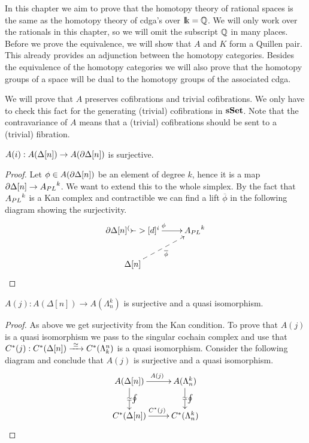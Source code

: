 

In this chapter we aim to prove that the homotopy theory of rational spaces is the same as the homotopy theory of cdga's over $\mathrm{I\!k} = \mathbb{Q}$. We will only work over the rationals in this chapter, so we will omit the subscript $\mathbb{Q}$ in many places. Before we prove the equivalence, we will show that $A$ and $K$ form a Quillen pair. This already provides an adjunction between the homotopy categories. Besides the equivalence of the homotopy categories we will also prove that the homotopy groups of a space will be dual to the homotopy groups of the associated cdga.

We will prove that $A$ preserves cofibrations and trivial cofibrations. We only have to check this fact for the generating (trivial) cofibrations in $\mathbf{s{\mathbf{Set}}}$. Note that the contravariance of $A$ means that a (trivial) cofibrations should be sent to a (trivial) fibration.

\begin{lemma}
	$A(i) : A(\Delta[n]) \to A(\partial \Delta[n])$ is surjective.
\end{lemma}
\begin{proof}
	Let $\phi \in A(\partial \Delta[n])$ be an element of degree $k$, hence it is a map $\partial \Delta[n] \to {A_{PL}}^k$. We want to extend this to the whole simplex. By the fact that ${A_{PL}}^k$ is a Kan complex and contractible we can find a lift $\overline{\phi}$ in the following diagram showing the surjectivity.
	\begin{displaymath}
		\xymatrix {
		\del \Delta[n] \ar[r]^\phi \arcof[d]^i & \Apl^k \\
		\Delta[n] \ar@{-->}[ru]_{\overline{\phi}}
		}
	\end{displaymath}
\end{proof}

\begin{lemma}
	$A(j) : A(\Delta[n]) \to A(\Lambda^k_n)$ is surjective and a quasi isomorphism.
\end{lemma}
\begin{proof}
	As above we get surjectivity from the Kan condition. To prove that $A(j)$ is a quasi isomorphism we pass to the singular cochain complex and use that $C^\ast(j) : C^\ast(\Delta[n]) \xrightarrow{\,\,{\simeq}\,\,} C^\ast(\Lambda^n_k)$ is a quasi isomorphism. Consider the following diagram and conclude that $A(j)$ is surjective and a quasi isomorphism.
	\begin{displaymath}
		\xymatrix {
		A(\Delta[n]) \ar[r]^{A(j)} \arwe[d]^\oint & A(\Lambda^k_n) \arwe[d]^\oint \\
		C^\ast(\Delta[n]) \ar[r]^{C^\ast(j)} & C^\ast(\Lambda^k_n)
		}
	\end{displaymath}
\end{proof}

